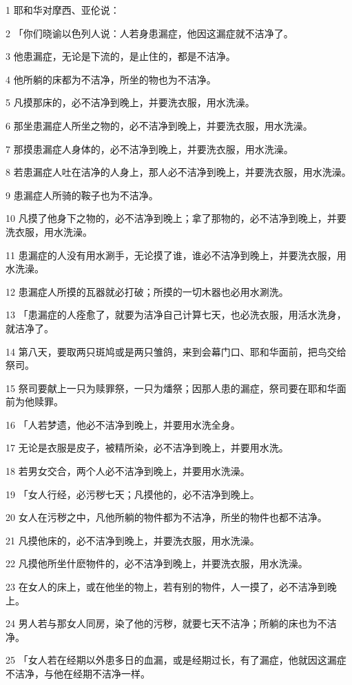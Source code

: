 \par 1 耶和华对摩西、亚伦说：
\par 2 「你们晓谕以色列人说：人若身患漏症，他因这漏症就不洁净了。
\par 3 他患漏症，无论是下流的，是止住的，都是不洁净。
\par 4 他所躺的床都为不洁净，所坐的物也为不洁净。
\par 5 凡摸那床的，必不洁净到晚上，并要洗衣服，用水洗澡。
\par 6 那坐患漏症人所坐之物的，必不洁净到晚上，并要洗衣服，用水洗澡。
\par 7 那摸患漏症人身体的，必不洁净到晚上，并要洗衣服，用水洗澡。
\par 8 若患漏症人吐在洁净的人身上，那人必不洁净到晚上，并要洗衣服，用水洗澡。
\par 9 患漏症人所骑的鞍子也为不洁净。
\par 10 凡摸了他身下之物的，必不洁净到晚上；拿了那物的，必不洁净到晚上，并要洗衣服，用水洗澡。
\par 11 患漏症的人没有用水涮手，无论摸了谁，谁必不洁净到晚上，并要洗衣服，用水洗澡。
\par 12 患漏症人所摸的瓦器就必打破；所摸的一切木器也必用水涮洗。
\par 13 「患漏症的人痊愈了，就要为洁净自己计算七天，也必洗衣服，用活水洗身，就洁净了。
\par 14 第八天，要取两只斑鸠或是两只雏鸽，来到会幕门口、耶和华面前，把鸟交给祭司。
\par 15 祭司要献上一只为赎罪祭，一只为燔祭；因那人患的漏症，祭司要在耶和华面前为他赎罪。
\par 16 「人若梦遗，他必不洁净到晚上，并要用水洗全身。
\par 17 无论是衣服是皮子，被精所染，必不洁净到晚上，并要用水洗。
\par 18 若男女交合，两个人必不洁净到晚上，并要用水洗澡。
\par 19 「女人行经，必污秽七天；凡摸他的，必不洁净到晚上。
\par 20 女人在污秽之中，凡他所躺的物件都为不洁净，所坐的物件也都不洁净。
\par 21 凡摸他床的，必不洁净到晚上，并要洗衣服，用水洗澡。
\par 22 凡摸他所坐什麽物件的，必不洁净到晚上，并要洗衣服，用水洗澡。
\par 23 在女人的床上，或在他坐的物上，若有别的物件，人一摸了，必不洁净到晚上。
\par 24 男人若与那女人同房，染了他的污秽，就要七天不洁净；所躺的床也为不洁净。
\par 25 「女人若在经期以外患多日的血漏，或是经期过长，有了漏症，他就因这漏症不洁净，与他在经期不洁净一样。
